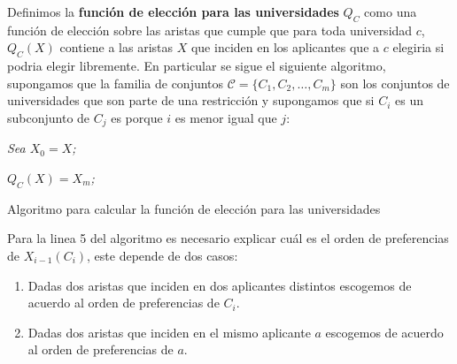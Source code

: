 \begin{dfn}
Definimos la \textbf{función de elección para las universidades} $Q_C$ como una función de elección sobre las aristas que cumple que para toda universidad $c$, $Q_C(X)$ contiene a las aristas $X$ que inciden en los aplicantes que a $c$ elegiria si podria elegir libremente. En particular se sigue el siguiente algoritmo, supongamos que la familia de conjuntos $\mathcal{C}=\{C_1,C_2,\dots,C_m\}$ son los conjuntos de universidades que son parte de una restricción y supongamos que si $C_i$ es un subconjunto de $C_j$ es porque $i$ es menor igual que $j$:

\IncMargin{1em}
\begin{Algoritmo}[H]

\BlankLine
\emph{Sea $X_0 = X$;}


\emph{$Q_C(X) = X_m$;}
\caption{Algoritmo para calcular la función de elección para las universidades}
\end{Algoritmo}
\DecMargin{1em}

Para la linea 5 del algoritmo es necesario explicar cuál es el orden de preferencias de $X_{i-1}(C_i)$, este depende de dos casos: 
\begin{enumerate}
\item Dadas dos aristas que inciden en dos aplicantes distintos escogemos de acuerdo al orden de preferencias de $C_i$.
\item Dadas dos aristas que inciden en el mismo aplicante $a$ escogemos de acuerdo al orden de preferencias de $a$.
\end{enumerate}

\end{dfn}

